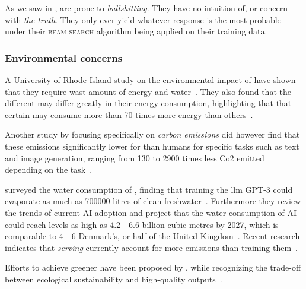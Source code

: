 As we saw in ,  are prone to
\textit{bullshitting}. They have no intuition of, or concern with \textit{the
    truth}. They only ever yield whatever response is the most probable under their
\textsc{beam search} algorithm being applied on their training data.

\subsubsection{Environmental concerns}

A University of Rhode Island study on the environmental impact of  have shown that
they require wast amount of energy and water~\cite{hungryLlm}. They also found that the different
 may differ greatly in their energy consumption, highlighting that that certain
 may consume more than \num{70} times more energy than others~\cite{hungryLlm}.

Another study by \citeauthor{llmCarbon} focusing specifically on \textit{carbon emissions} did
however find that these emissions significantly lower for  than humans for specific
tasks such as text and image generation, ranging from \num{130} to \num{2900} times less Co2 emitted
depending on the task~\cite[1]{llmCarbon}.

\citeauthor{thirstyLlm} surveyed the water consumption of , finding that training the
\acrshort{llm} \textsc{GPT-3} could evaporate as much as \num{700000} litres of clean
freshwater~\cite[1]{thirstyLlm}. Furthermore they review the trends of current AI adoption and
project that the water consumption of AI could reach levels as high as \num{4.2} - \num{6.6} billion
cubic metres by \num{2027}, which is comparable to \num{4} - \num{6} Denmark's, or half of the United
Kingdom~\cite[1]{thirstyLlm}. Recent research indicates that \textit{serving} 
currently account for more emissions than training them~\cite[37]{sustainableLlmServing}.

Efforts to achieve greener  have been proposed by \citeauthor{sproutGreenLlm}, while
recognizing the trade-off between ecological sustainability and high-quality
outputs~\cite[21799]{sproutGreenLlm}.


